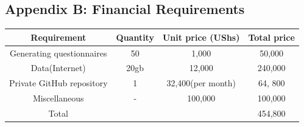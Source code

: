 \documentclass[12pt]{article}
\begin{document}
\subsection{Appendix B: Financial Requirements}
\begin{tabular} {|c|c|c|c|}
	\hline
	Requirement & Quantity & Unit price (UShs) & Total price \\ \hline
	Generating questionnaires & 50 &  1,000 & 50,000 \\ \hline
	Data(Internet) & 20gb &  12,000 & 240,000 \\ \hline
	Private GitHub repository & 1 &  32,400(per month) & 64, 800\\ \hline
	Miscellaneous & -  & 100,000 & 100,000\\ \hline
	Total &  &  & 454,800\\ \hline
\end{tabular}
\end{document}
